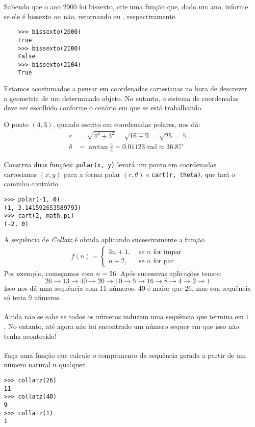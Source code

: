 \documentclass[12pt]{article}
\begin{document}
	\quest Sabendo que o ano 2000 foi bissexto, crie uma função que, dado um ano, informe se ele é bissexto ou não, retornando  ou , respectivamente.\\
	
	\example
	\begin{lstlisting}
	>>> bissexto(2000)
	True
	>>> bissexto(2100)
	False
	>>> bissexto(2104)
	True
	\end{lstlisting}
	
	\pagebreak
	
	
	Estamos acostumados a pensar em coordenadas cartesianas na hora de descrever a geometria de um determinado objeto. No entanto, o sistema de coordenadas deve ser escolhido conforme o cenário em que se está trabalhando.
	
	
	
	O ponto $(4, 3)$, quando escrito em coordenadas polares, nos dá:
	\begin{align*}
		r &= \sqrt{4^2 + 3^2} = \sqrt{16 + 9} = \sqrt{25} = 5\\
		\theta &= \arctan\frac{3}{4} = 0.01123 \text{ rad} \approx 36.87^{\circ}
	\end{align*}
	
	\quest Construa duas funções: \texttt{polar(x, y)} levará um ponto em coordenadas cartesianas $(x, y)$ para a forma polar $(r, \theta)$ e \texttt{cart(r, theta)}, que fará o caminho contrário.\\
	
	\example
	\begin{lstlisting}
>>> polar(-1, 0)
(1, 3.141592653589793)
>>> cart(2, math.pi)
(-2, 0)
	\end{lstlisting}
	
	\pagebreak
	
	
	A sequência de \emph{Collatz} é obtida aplicando sucessivamente a função
	{\large
	\begin{align*}
		f(n) = \begin{cases}
		3n + 1, &\text{ se } n \text{ for ímpar}\\
		n \div 2, &\text{ se } n \text{ for par}
		\end{cases}
	\end{align*}
	}
	Por exemplo, começamos com $n = 26$. Após sucessivas aplicações temos:
		$$26 \to 13 \to 40 \to 20 \to 10 \to 5 \to 16 \to 8 \to 4 \to 2 \to 1$$
	Isso nos dá uma sequência com $11$ números. $40$ é maior que $26$, mas sua sequência só teria $9$ números.\\
	\\
	Ainda não se sabe se todos os números induzem uma sequência que termina em $1$. No entanto, até agora não foi encontrado um número sequer em que isso não tenha acontecido!\\
	\\
	\quest Faça uma função que calcule o comprimento da sequência gerada a partir de um número natural $n$ qualquer.\\

	\example
	\begin{lstlisting}
>>> collatz(26)
11
>>> collatz(40)
9
>>> collatz(1)
1
	\end{lstlisting}
	
\end{document}
